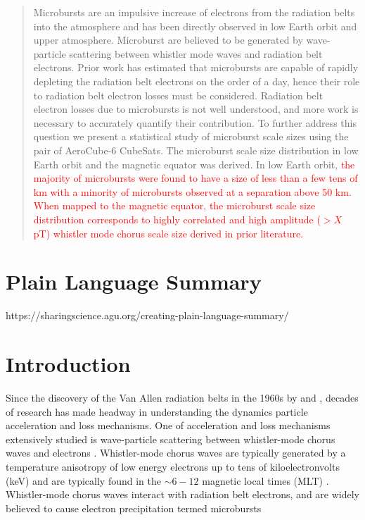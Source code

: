 \documentclass[draft]{agujournal2019}
\begin{document}
\begin{abstract}
Microbursts are an impulsive increase of electrons from the radiation belts into the atmosphere and has been directly observed in low Earth orbit and upper atmosphere. Microburst are believed to be generated by wave-particle scattering between whistler mode waves and radiation belt electrons. Prior work has estimated that microbursts are capable of rapidly depleting the radiation belt electrons on the order of a day, hence their role to radiation belt electron losses must be considered. Radiation belt electron losses due to microbursts is not well understood, and more work is necessary to accurately quantify their contribution. To further address this question we present a statistical study of microburst scale sizes using the pair of AeroCube-6 CubeSats. The microburst scale size distribution in low Earth orbit and the magnetic equator was derived. In low Earth orbit, \textcolor{red}{the majority of microbursts were found to have a size of less than a few tens of km with a minority of microbursts observed at a separation above 50 km. When mapped to the magnetic equator, the microburst scale size distribution corresponds to highly correlated and high amplitude ($> X$ pT) whistler mode chorus scale size derived in prior literature.}
\end{abstract}

\section{Plain Language Summary}
https://sharingscience.agu.org/creating-plain-language-summary/

\section{Introduction}
Since the discovery of the Van Allen radiation belts in the 1960s by  and , decades of research has made headway in understanding the dynamics particle acceleration and loss mechanisms. One of acceleration and loss mechanisms extensively studied is wave-particle scattering between whistler-mode chorus waves and electrons \cite{Abel1998_1, Meredith2002, Horne2003, Thorne2005, Millan2007, Bortnik2008}. Whistler-mode chorus waves are typically generated by a temperature anisotropy of low energy electrons up to tens of kiloelectronvolts (keV) and are typically found in the $\sim 6-12$ magnetic local times (MLT) \cite{Li2009, Li2009b}. Whistler-mode chorus waves interact with radiation belt electrons, and are widely believed to cause electron precipitation termed microbursts \cite{Millan2007}
\end{document}
